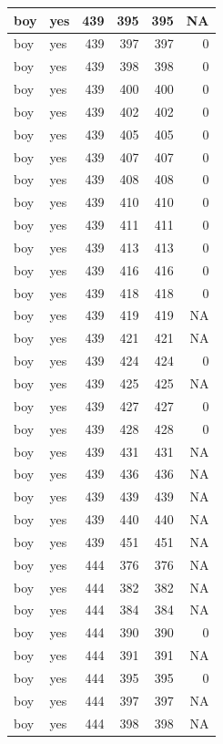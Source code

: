 \documentclass[man]{apa6}
\begin{document}
\begin{tabular}{l|l|r|r|r|r}
\hline
boy & yes & 439 & 395 & 395 & NA\\
\hline
boy & yes & 439 & 397 & 397 & 0\\
\hline
boy & yes & 439 & 398 & 398 & 0\\
\hline
boy & yes & 439 & 400 & 400 & 0\\
\hline
boy & yes & 439 & 402 & 402 & 0\\
\hline
boy & yes & 439 & 405 & 405 & 0\\
\hline
boy & yes & 439 & 407 & 407 & 0\\
\hline
boy & yes & 439 & 408 & 408 & 0\\
\hline
boy & yes & 439 & 410 & 410 & 0\\
\hline
boy & yes & 439 & 411 & 411 & 0\\
\hline
boy & yes & 439 & 413 & 413 & 0\\
\hline
boy & yes & 439 & 416 & 416 & 0\\
\hline
boy & yes & 439 & 418 & 418 & 0\\
\hline
boy & yes & 439 & 419 & 419 & NA\\
\hline
boy & yes & 439 & 421 & 421 & NA\\
\hline
boy & yes & 439 & 424 & 424 & 0\\
\hline
boy & yes & 439 & 425 & 425 & NA\\
\hline
boy & yes & 439 & 427 & 427 & 0\\
\hline
boy & yes & 439 & 428 & 428 & 0\\
\hline
boy & yes & 439 & 431 & 431 & NA\\
\hline
boy & yes & 439 & 436 & 436 & NA\\
\hline
boy & yes & 439 & 439 & 439 & NA\\
\hline
boy & yes & 439 & 440 & 440 & NA\\
\hline
boy & yes & 439 & 451 & 451 & NA\\
\hline
boy & yes & 444 & 376 & 376 & NA\\
\hline
boy & yes & 444 & 382 & 382 & NA\\
\hline
boy & yes & 444 & 384 & 384 & NA\\
\hline
boy & yes & 444 & 390 & 390 & 0\\
\hline
boy & yes & 444 & 391 & 391 & NA\\
\hline
boy & yes & 444 & 395 & 395 & 0\\
\hline
boy & yes & 444 & 397 & 397 & NA\\
\hline
boy & yes & 444 & 398 & 398 & NA\\

\end{tabular}
\end{document}
